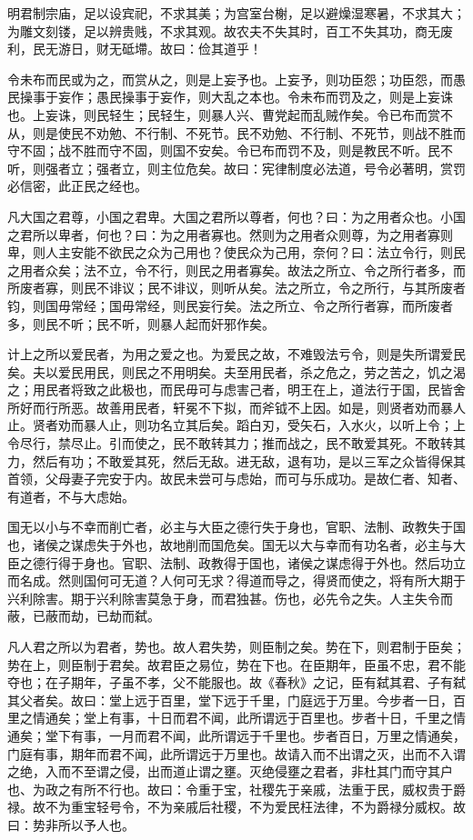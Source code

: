\documentclass[]{article}
\begin{document}
明君制宗庙，足以设宾祀，不求其美；为宫室台榭，足以避燥湿寒暑，不求其大；为雕文刻镂，足以辨贵贱，不求其观。故农夫不失其时，百工不失其功，商无废利，民无游日，财无砥墆。故曰：俭其道乎！

令未布而民或为之，而赏从之，则是上妄予也。上妄予，则功臣怨；功臣怨，而愚民操事于妄作；愚民操事于妄作，则大乱之本也。令未布而罚及之，则是上妄诛也。上妄诛，则民轻生；民轻生，则暴人兴、曹党起而乱贼作矣。令已布而赏不从，则是使民不劝勉、不行制、不死节。民不劝勉、不行制、不死节，则战不胜而守不固；战不胜而守不固，则国不安矣。令已布而罚不及，则是教民不听。民不听，则强者立；强者立，则主位危矣。故曰：宪律制度必法道，号令必著明，赏罚必信密，此正民之经也。

凡大国之君尊，小国之君卑。大国之君所以尊者，何也？曰：为之用者众也。小国之君所以卑者，何也？曰：为之用者寡也。然则为之用者众则尊，为之用者寡则卑，则人主安能不欲民之众为己用也？使民众为己用，奈何？曰：法立令行，则民之用者众矣；法不立，令不行，则民之用者寡矣。故法之所立、令之所行者多，而所废者寡，则民不诽议；民不诽议，则听从矣。法之所立，令之所行，与其所废者钧，则国毋常经；国毋常经，则民妄行矣。法之所立、令之所行者寡，而所废者多，则民不听；民不听，则暴人起而奸邪作矣。

计上之所以爱民者，为用之爱之也。为爱民之故，不难毁法亏令，则是失所谓爱民矣。夫以爱民用民，则民之不用明矣。夫至用民者，杀之危之，劳之苦之，饥之渴之；用民者将致之此极也，而民毋可与虑害己者，明王在上，道法行于国，民皆舍所好而行所恶。故善用民者，轩冕不下拟，而斧钺不上因。如是，则贤者劝而暴人止。贤者劝而暴人止，则功名立其后矣。蹈白刃，受矢石，入水火，以听上令；上令尽行，禁尽止。引而使之，民不敢转其力；推而战之，民不敢爱其死。不敢转其力，然后有功；不敢爱其死，然后无敌。进无敌，退有功，是以三军之众皆得保其首领，父母妻子完安于内。故民未尝可与虑始，而可与乐成功。是故仁者、知者、有道者，不与大虑始。

国无以小与不幸而削亡者，必主与大臣之德行失于身也，官职、法制、政教失于国也，诸侯之谋虑失于外也，故地削而国危矣。国无以大与幸而有功名者，必主与大臣之德行得于身也。官职、法制、政教得于国也，诸侯之谋虑得于外也。然后功立而名成。然则国何可无道？人何可无求？得道而导之，得贤而使之，将有所大期于兴利除害。期于兴利除害莫急于身，而君独甚。伤也，必先令之失。人主失令而蔽，已蔽而劫，已劫而弑。

凡人君之所以为君者，势也。故人君失势，则臣制之矣。势在下，则君制于臣矣；势在上，则臣制于君矣。故君臣之易位，势在下也。在臣期年，臣虽不忠，君不能夺也；在子期年，子虽不孝，父不能服也。故《春秋》之记，臣有弑其君、子有弑其父者矣。故曰：堂上远于百里，堂下远于千里，门庭远于万里。今步者一日，百里之情通矣；堂上有事，十日而君不闻，此所谓远于百里也。步者十日，千里之情通矣；堂下有事，一月而君不闻，此所谓远于千里也。步者百日，万里之情通矣，门庭有事，期年而君不闻，此所谓远于万里也。故请入而不出谓之灭，出而不入谓之绝，入而不至谓之侵，出而道止谓之壅。灭绝侵壅之君者，非杜其门而守其户也、为政之有所不行也。故曰：令重于宝，社稷先于亲戚，法重于民，威权贵于爵禄。故不为重宝轻号令，不为亲戚后社稷，不为爱民枉法律，不为爵禄分威权。故曰：势非所以予人也。
\end{document}

